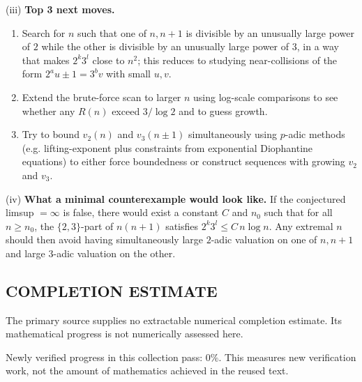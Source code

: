 (iii) \textbf{Top 3 next moves.}
\begin{enumerate}
\item Search for $n$ such that one of $n,n+1$ is divisible by an unusually large power of $2$ while the other is divisible by an unusually large power of $3$, in a way that makes $2^k3^l$ close to $n^2$; this reduces to studying near-collisions of the form $2^a u \pm 1=3^b v$ with small $u,v$.
\item Extend the brute-force scan to larger $n$ using log-scale comparisons to see whether any $R(n)$ exceed $3/\log 2$ and to guess growth.
\item Try to bound $v_2(n)$ and $v_3(n\pm 1)$ simultaneously using $p$-adic methods (e.g. lifting-exponent plus constraints from exponential Diophantine equations) to either force boundedness or construct sequences with growing $v_2$ and $v_3$.
\end{enumerate}

(iv) \textbf{What a minimal counterexample would look like.}
If the conjectured limsup $=\infty$ is false, there would exist a constant $C$ and $n_0$ such that for all $n\ge n_0$, the $\{2,3\}$-part of $n(n+1)$ satisfies $2^k3^l\le C\,n\log n$. Any extremal $n$ should then avoid having simultaneously large $2$-adic valuation on one of $n,n+1$ and large $3$-adic valuation on the other.




\subsection*{COMPLETION ESTIMATE}
The primary source supplies no extractable numerical completion estimate. Its mathematical progress is not numerically assessed here.

Newly verified progress in this collection pass: $0\%$. This measures new verification work, not the amount of mathematics achieved in the reused text.
